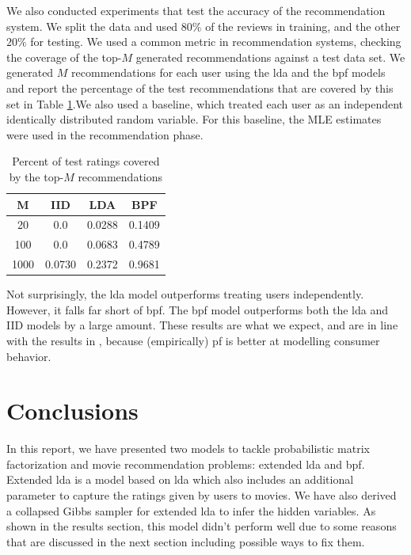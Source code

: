 \documentclass{article} %
\begin{document}
We also conducted experiments that test the accuracy of the recommendation system. We split the data and used $80\%$ of the reviews in training, and the other $20\%$ for testing. We used a common metric in recommendation systems, checking the coverage of the top-$M$ generated recommendations against a test data set. We generated $M$ recommendations for each user using the \gls{lda} and the \gls{bpf} models and report the percentage of the test recommendations that are covered by this set in Table \ref{table:top-m}.We also used a baseline, which treated each user as an independent identically distributed random variable. For this baseline, the MLE estimates were used in the recommendation phase. 
\begin{table}[h]
    \centering
    \begin{tabular}{c|ccc} \toprule
    \textbf{M}    & \textbf{IID}    & \textbf{LDA}    & \textbf{BPF}    \\ \midrule
    20   & 0.0    & 0.0288 & 0.1409 \\
    100  & 0.0    & 0.0683 & 0.4789 \\
    1000 & 0.0730 & 0.2372 & 0.9681 \\
    \end{tabular}
    \caption {Percent of test ratings covered by the top-$M$ recommendations}
    \label{table:top-m}
\end{table}

Not surprisingly, the \gls{lda} model outperforms treating users independently. However, it falls far short of \gls{bpf}. The \gls{bpf} model outperforms both the \gls{lda} and IID models by a large amount. These results are what we expect, and are in line with the results in \cite{gopalan2013scalable}, because (empirically) \gls{pf} is better at modelling consumer behavior.

\section{Conclusions}
In this report, we have presented two models to tackle probabilistic matrix 
factorization and movie recommendation problems: extended \gls{lda} and 
\gls{bpf}. Extended \gls{lda} is a model based on \gls{lda} which also includes 
an additional parameter to capture the ratings given by users to movies. We have 
also derived a collapsed Gibbs sampler for extended \gls{lda} to infer the hidden 
variables. As shown in the results section, this model didn't perform well 
due to some reasons that are discussed in the next section including possible 
ways to fix them. 
\end{document}
